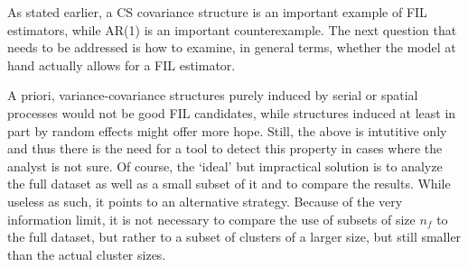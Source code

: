 \documentclass[11pt,a5paper,twoside]{book}
\begin{document}
As stated earlier, a CS covariance structure is an important example of FIL estimators, while AR(1) is an important counterexample. The next question that needs to be addressed is how to examine, in general terms, whether the model at hand actually allows for a FIL estimator.

A priori, variance-covariance structures purely induced by serial or spatial processes would not be good FIL candidates, while structures induced at least in part by random effects might offer more hope. Still, the above is intutitive only and thus there is the need for a tool to detect this property in cases where the analyst is not sure. Of course, the `ideal' but impractical solution is to analyze the full dataset as well as a small subset of it and to compare the results. While useless as such, it points to an alternative strategy. Because of the very information limit, it is not necessary to compare the use of subsets of size $n_f$ to the full dataset, but rather to a subset of clusters of a larger size, but still smaller than the actual cluster sizes. 
\end{document}
